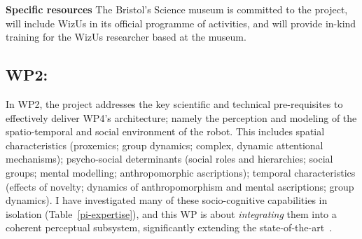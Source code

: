\documentclass[11pt,a4paper]{report}
\newcommand{\project}{WizUs\xspace}
\begin{document}
\textbf{Specific resources} The Bristol's Science museum is committed to the
project, will include \project in its official programme of activities, and will
provide in-kind training for the \project researcher based at the museum.

% 
% 
% 
% 
% 
% 
% 
% 
% 



\subsection{WP2: \textbf{\wpTwo}}


In WP2, the project addresses the key scientific and technical pre-requisites to
effectively deliver WP4's architecture; namely the perception and modeling of
the spatio-temporal and social environment of the robot. This includes spatial
characteristics (proxemics; group dynamics; complex, dynamic attentional
mechanisms); psycho-social determinants (social roles and hierarchies; social
groups; mental modelling; anthropomorphic ascriptions); temporal characteristics
(effects of novelty; dynamics of anthropomorphism and mental ascriptions; group
dynamics). I have investigated many of these socio-cognitive capabilities in
isolation (Table~\ref{pi-expertise}), and this WP is about
\emph{integrating} them into a coherent perceptual subsystem, significantly
extending the state-of-the-art~\cite{lemaignan2017artificial, baxter2016cognitive}.
\end{document}
